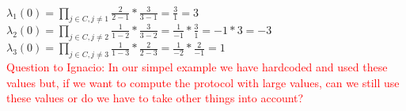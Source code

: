 \noindent
\begin{infobox}
\begin{math}\lambda_1(0)=\prod\limits_{j\in C,j\neq 1} \frac{2}{2-1} * \frac{3}{3-1} =\frac{3}{1} = 3 \end{math}\\
\begin{math}\lambda_2(0)=\prod\limits_{j\in C,j\neq 2} \frac{1}{1-2} * \frac{3}{3-2} =\frac{1}{-1}* \frac{3}{1} =-1* 3=-3 \end{math}\\
\begin{math}\lambda_3(0)=\prod\limits_{j\in C,j\neq 3} \frac{1}{1-3} * \frac{2}{2-3} =\frac{1}{-2}* \frac{2}{-1} =1 \end{math}\\
\textcolor{red}{Question to Ignacio: In our simpel example we have hardcoded and used these values but, if we want to compute the protocol with large values, can we still use these values or do we have to take other things into account?}
\label{info:Computing_the_coefficients}
\end{infobox}
